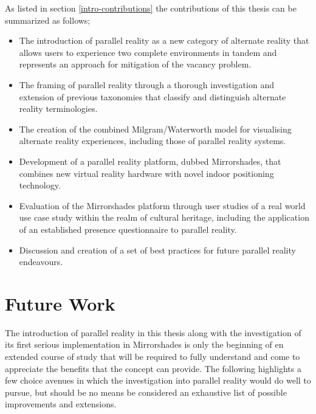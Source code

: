 As listed in section \ref{intro-contributions} the contributions of this thesis can be summarized as follows;

\begin{itemize}
	\item The introduction of parallel reality as a new category of alternate reality that allows users to experience two complete environments in tandem and represents an approach for mitigation of the vacancy problem.
	\item The framing of parallel reality through a thorough investigation and extension of previous taxonomies that classify and distinguish alternate reality terminologies.
	\item The creation of the combined Milgram/Waterworth model for visualising alternate reality experiences, including those of parallel reality systems.
	\item Development of a parallel reality platform, dubbed Mirrorshades, that combines new virtual reality hardware with novel indoor positioning technology.
	\item Evaluation of the Mirrorshades platform through user studies of a real world use case study within the realm of cultural heritage, including the application of an established presence questionnaire to parallel reality.
	\item Discussion and creation of a set of best practices for future parallel reality endeavours.
\end{itemize}


\section{Future Work}

The introduction of parallel reality in this thesis along with the investigation of its first serious implementation in Mirrorshades is only the beginning of en extended course of study that will be required to fully understand and come to appreciate the benefits that the concept can provide. The following highlights a few choice avenues in which the investigation into parallel reality would do well to pursue, but should be no means be considered an exhaustive list of possible improvements and extensions.

